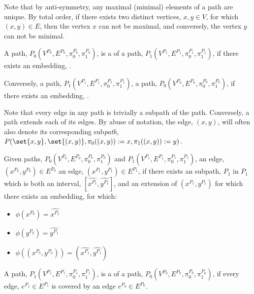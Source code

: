 \documentclass[a4paper]{amsart}
\begin{document}
Note that by anti-symmetry, any maximal (minimal) elements of a path are unique. By total
order, if there exists two distinct vertices, $x,y \in V$, for which $(x,y) \in E$, then
the vertex $x$ can not be maximal, and conversely, the vertex $y$ can not be minimal.

\begin{definition}
A path, $P_0(V^{P_0}, E^{P_0}, \pi^{P_0}_0, \pi^{P_0}_1)$, is a  of a
path, $P_1(V^{P_1}, E^{P_1}, \pi^{P_1}_0, \pi^{P_1}_1)$, if there exists an embedding,
.

Conversely, a path, $P_1(V^{P_1}, E^{P_1}, \pi^{P_1}_0, \pi^{P_1}_1)$, 
a path, $P_0(V^{P_0}, E^{P_0}, \pi^{P_0}_0, \pi^{P_0}_1)$, if there exists an embedding,
.
\end{definition}

Note that every edge in any path is trivially a subpath of the path. Conversely, a path
extends each of its edges. By abuse of notation, the edge, $(x,y)$, will often also denote
its corresponding sub\emph{path}, $P(\set{x,y}, \set{(x,y)}, \pi_0((x,y)):=x,
\pi_1((x,y)):=y)$.

\begin{definition}
Given paths, $P_0(V^{P_0}, E^{P_0}, \pi^{P_0}_0, \pi^{P_0}_1)$ and $P_1(V^{P_1}, E^{P_1},
\pi^{P_1}_0, \pi^{P_1}_1)$, an edge, $(x^{P_0}, y^{P_0}) \in E^{P_0}$  an
edge, $(x^{P_1}, y^{P_1}) \in E^{P_1}$, if there exists an subpath, $\hat{P_1}$ in $P_1$
which is both an interval, $[\hat{x^{P_1}}, \hat{y^{P_1}}]$, and an extension of
$(x^{P_1}, y^{P_1})$ for which there exists an embedding,  for which:
\begin{itemize}
\item $\phi(x^{P_0}) = \hat{x^{P_1}}$
\item $\phi(y^{P_0}) = \hat{y^{P_1}}$
\item $\phi( (x^{P_0}, y^{P_0}) ) = (\hat{x^{P_1}}, \hat{y^{P_1}})$
\end{itemize}
\end{definition}

\begin{definition}
A path, $P_1(V^{P_1}, E^{P_1}, \pi^{P_1}_0, \pi^{P_1}_1)$, is a  of a
path, $P_0(V^{P_0}, E^{P_0}, \pi^{P_0}_0, \pi^{P_0}_1)$, if every edge, $e^{P_1} \in 
E^{P_1}$ is covered by an edge $e^{P_0} \in E^{P_0}$.
\end{definition}
\end{document}
